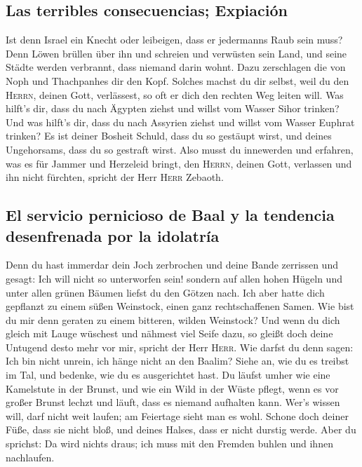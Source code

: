 \hypertarget{las-terribles-consecuencias-expiaciuxf3n}{%
\subsection{Las terribles consecuencias;
Expiación}\label{las-terribles-consecuencias-expiaciuxf3n}}

 Ist denn Israel ein Knecht oder leibeigen, dass er
jedermanns Raub sein muss?  Denn Löwen brüllen über ihn
und schreien und verwüsten sein Land, und seine Städte werden verbrannt,
dass niemand darin wohnt.  Dazu zerschlagen die von Noph
und Thachpanhes dir den Kopf.  Solches machst du dir
selbst, weil du den \textsc{Herrn}, deinen Gott, verlässest, so oft er
dich den rechten Weg leiten will.  Was hilft's dir, dass
du nach Ägypten ziehst und willst vom Wasser Sihor trinken? Und was
hilft's dir, dass du nach Assyrien ziehst und willst vom Wasser Euphrat
trinken?  Es ist deiner Bosheit Schuld, dass du so
gestäupt wirst, und deines Ungehorsams, dass du so gestraft wirst. Also
musst du innewerden und erfahren, was es für Jammer und Herzeleid
bringt, den \textsc{Herrn}, deinen Gott, verlassen und ihn nicht
fürchten, spricht der Herr \textsc{Herr} Zebaoth.

\hypertarget{el-servicio-pernicioso-de-baal-y-la-tendencia-desenfrenada-por-la-idolatruxeda}{%
\subsection{El servicio pernicioso de Baal y la tendencia desenfrenada
por la
idolatría}\label{el-servicio-pernicioso-de-baal-y-la-tendencia-desenfrenada-por-la-idolatruxeda}}

 Denn du hast immerdar dein Joch zerbrochen und deine
Bande zerrissen und gesagt: Ich will nicht so unterworfen sein! sondern
auf allen hohen Hügeln und unter allen grünen Bäumen liefst du den
Götzen nach.  Ich aber hatte dich gepflanzt zu einem
süßen Weinstock, einen ganz rechtschaffenen Samen. Wie bist du mir denn
geraten zu einem bitteren, wilden Weinstock?  Und wenn du
dich gleich mit Lauge wüschest und nähmest viel Seife dazu, so gleißt
doch deine Untugend desto mehr vor mir, spricht der Herr \textsc{Herr}.
 Wie darfst du denn sagen: Ich bin nicht unrein, ich
hänge nicht an den Baalim? Siehe an, wie du es treibst im Tal, und
bedenke, wie du es ausgerichtet hast.  Du läufst umher
wie eine Kamelstute in der Brunst, und wie ein Wild in der Wüste pflegt,
wenn es vor großer Brunst lechzt und läuft, dass es niemand aufhalten
kann. Wer's wissen will, darf nicht weit laufen; am Feiertage sieht man
es wohl.  Schone doch deiner Füße, dass sie nicht bloß,
und deines Halses, dass er nicht durstig werde. Aber du sprichst: Da
wird nichts draus; ich muss mit den Fremden buhlen und ihnen nachlaufen.

